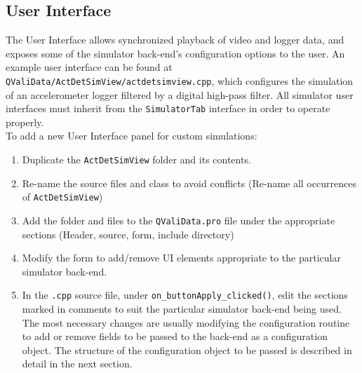 \documentclass[]{article}
\begin{document}
	\subsection{User Interface}
		The User Interface allows synchronized playback of video and logger data, and exposes some of the simulator back-end's configuration options to the user. An example user interface can be found at \texttt{QValiData/ActDetSimView/actdetsimview.cpp}, which configures the simulation of an accelerometer logger filtered by a digital high-pass filter. All simulator user interfaces must inherit from the \texttt{SimulatorTab} interface in order to operate properly.\\
		To add a new User Interface panel for custom simulations:
		\begin{enumerate}
			\item Duplicate the \texttt{ActDetSimView} folder and its contents.
			\item Re-name the source files and class to avoid conflicts (Re-name all occurrences of \texttt{ActDetSimView})
			\item Add the folder and files to the \texttt{QValiData.pro} file under the appropriate sections (Header, source, form, include directory)
			\item Modify the form to add/remove UI elements appropriate to the particular simulator back-end. 
			\item In the \texttt{.cpp} source file, under \texttt{on\_buttonApply\_clicked()}, edit the sections marked in comments to suit the particular simulator back-end being used. The most necessary changes are usually modifying the configuration routine to add or remove fields to be passed to the back-end as a configuration object. The structure of the configuration object to be passed is described in detail in the next section.
		\end{enumerate}
		
\end{document}
